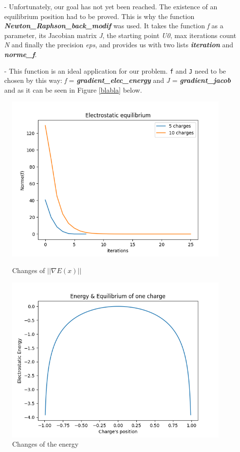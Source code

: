 \documentclass{article}
\begin{document}
\begin{itemize}
\item[-]Unfortunately, our goal has not yet been reached. The existence of an equilibrium position had to be proved. This is why the function \emph{\textbf{Newton\_Raphson\_back\_modif}} was used. It takes the function \emph{f} as a parameter, its Jacobian matrix \emph{J}, the starting point \emph{U0}, max iterations count \emph{N} and finally the precision \emph{eps}, and provides us with two lists \emph{\textbf{iteration}} and \emph{\textbf{norme\_f}}.
\item[-]This function is an ideal application for our problem. \texttt{f} and \texttt{J} need to be chosen by this way: \emph{f} = \emph{\textbf{gradient\_elec\_energy}} and \emph{J} = \emph{\textbf{gradient\_jacob}} and as it can be seen in Figure \ref{blabla} below.
\end{itemize}
\begin{figure}[h]
  \begin{minipage}[c]{0.46\linewidth}
    \includegraphics[scale=0.5]{Figure_2.png}
    \caption{Changes of $||\nabla E(x)||$}
    \label{blabla}
  \end{minipage}
  \hfill
  \begin{minipage}[c]{0.46\linewidth}
  \includegraphics[scale=0.5]{Figure_1.png}
  \caption{Changes of the energy}
  \label{blablabus}
  \end{minipage}
\end{figure}
\end{document}
